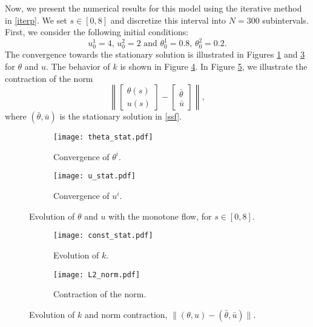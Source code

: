 \documentclass[12pt]{amsart}
\newcommand{\1}{{\chi}}
\theoremstyle{definition}
\begin{document}
 Now, we present the numerical results for this model using the iterative method in  \eqref{iterp}. 
{ We set $s\in[0,8]$ and discretize this interval into $N=300$ subintervals.} 
First, we consider the following initial conditions:
        \begin{equation*}
        u^1_0=4, \,  u^2_0=2  \text{ and } \theta^1_0= 0.8, \, \theta^2_0=0.2.
        \end{equation*}
        The convergence towards the stationary solution is illustrated in Figures \ref{fig:stat:theta} and   \ref{fig:stat:valuef} for $\theta$ and $u$.   The behavior of $k$ is shown in Figure \ref{fig:stat:const}.
        In Figure
\ref{fig:L2_norm}, we illustrate the contraction of the norm
\[
\left\|
\left[
\begin{array}{c}
\theta(s)\\
u(s)
\end{array}
\right]
-
\left[
\begin{array}{c}
\bar \theta\\
\bar u
\end{array}
\right]
\right\|, 
\]
where $(\bar \theta, \bar u)$ is the stationary solution in \eqref{ssf}.
        \begin{figure}
        	\centering
        	\begin{subfigure}{0.49\textwidth}
        		\centering
        		\texttt{[image: theta\_stat.pdf]}
        		\caption{Convergence of  $\theta^i$.}
        		\label{fig:stat:theta}
        	\end{subfigure}
        	\begin{subfigure}{0.49\textwidth}
        		\centering
        		\texttt{[image: u\_stat.pdf]}
        		\caption{Convergence of  $u^i$.}
        		\label{fig:stat:valuef}
        	\end{subfigure}
        	\caption{Evolution of $\theta$ and $u$ with the monotone flow, for $s \in [0,8]$.}
        \end{figure}      
                \begin{figure}
                \centering
                \begin{subfigure}{0.5\textwidth}
                        \centering
                        \texttt{[image: const\_stat.pdf]}
                        \caption{Evolution of $k$.}
                        \label{fig:stat:const}
                \end{subfigure}
                \begin{subfigure}{0.5\textwidth}
                        \centering
                        \texttt{[image: L2\_norm.pdf]}
                        \caption{Contraction of the norm.}
                        \label{fig:L2_norm}
                \end{subfigure}
                \caption{Evolution of $k$ and norm contraction, $\|(\theta,u)-(\bar\theta,\bar u)\|$.}
                \label{fig:k_L2_norm}
        \end{figure}
\end{document}
